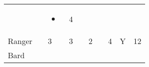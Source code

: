 \documentclass[12pt]{article}
\begin{document}
\begin{longtable}[]{@{}llllllllll@{}}
\begin{minipage}[t]{0.06\columnwidth}
\strut\end{minipage} &
\begin{minipage}[t]{0.06\columnwidth}\raggedright\strut
\strut\end{minipage} &
\begin{minipage}[t]{0.07\columnwidth}\raggedright\strut
\begin{itemize}
\item
\end{itemize}
\strut\end{minipage} &
\begin{minipage}[t]{0.08\columnwidth}\raggedright\strut
4
\strut\end{minipage}\tabularnewline
\begin{minipage}[t]{0.13\columnwidth}\raggedright\strut
Ranger
\strut\end{minipage} &
\begin{minipage}[t]{0.06\columnwidth}\raggedright\strut
\strut\end{minipage} &
\begin{minipage}[t]{0.06\columnwidth}\raggedright\strut
3
\strut\end{minipage} &
\begin{minipage}[t]{0.06\columnwidth}\raggedright\strut
3
\strut\end{minipage} &
\begin{minipage}[t]{0.06\columnwidth}\raggedright\strut
\strut\end{minipage} &
\begin{minipage}[t]{0.06\columnwidth}\raggedright\strut
2
\strut\end{minipage} &
\begin{minipage}[t]{0.06\columnwidth}\raggedright\strut
\strut\end{minipage} &
\begin{minipage}[t]{0.06\columnwidth}\raggedright\strut
4
\strut\end{minipage} &
\begin{minipage}[t]{0.07\columnwidth}\raggedright\strut
Y
\strut\end{minipage} &
\begin{minipage}[t]{0.08\columnwidth}\raggedright\strut
12
\strut\end{minipage}\tabularnewline
\begin{minipage}[t]{0.13\columnwidth}\raggedright\strut
Bard
\strut\end{minipage} &
\begin{minipage}[t]{0.06\columnwidth}\raggedright\strut
\strut\end{minipage} &

\end{longtable}
\end{document}
